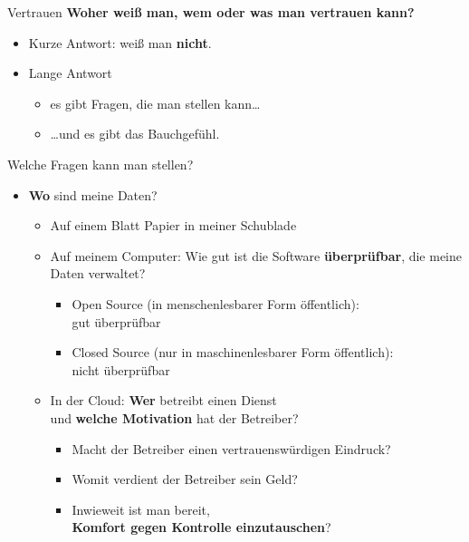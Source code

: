   \begin{frame}{Vertrauen}
    \textbf{Woher weiß man, wem oder was man vertrauen kann?}
    \begin{itemize}
      \item Kurze Antwort: weiß man \textbf{nicht}.
      \item Lange Antwort
      \begin{itemize}
        \item es gibt Fragen, die man stellen kann\ldots
        \item {\ldots}und es gibt das Bauchgefühl.
      \end{itemize}
    \end{itemize}
  \end{frame}
\begin{frame}{Welche Fragen kann man stellen?}
  \begin{itemize}
    \item \textbf{Wo} sind meine Daten?
    \begin{itemize}
      \item Auf einem Blatt Papier in meiner Schublade
      \item Auf meinem Computer: Wie gut ist die Software \textbf{überprüfbar}, die meine Daten verwaltet?
        \begin{itemize}
          \item Open Source (in menschenlesbarer Form öffentlich):\\gut überprüfbar
          \item Closed Source (nur in maschinenlesbarer Form öffentlich):\\nicht überprüfbar
        \end{itemize}
      \item In der Cloud: \textbf{Wer} betreibt einen Dienst\\und \textbf{welche Motivation} hat der Betreiber?
        \begin{itemize}
          \item Macht der Betreiber einen vertrauenswürdigen Eindruck?
          \item Womit verdient der Betreiber sein Geld?
          \item Inwieweit ist man bereit,\\ \textbf{Komfort gegen Kontrolle einzutauschen}?
        \end{itemize}
    \end{itemize}
  \end{itemize}
\end{frame}

